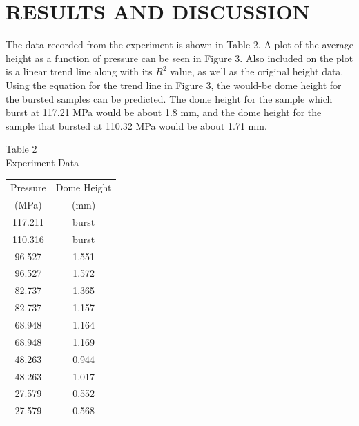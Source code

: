 \documentclass[12pt]{article}
\begin{document}
\section*{\fontsize{12}{12}\selectfont RESULTS AND DISCUSSION}
The data recorded from the experiment is shown in Table 2. A plot of the average height as a function of pressure can be seen in Figure 3. Also included on the plot is a linear trend line along with its $R^2$ value, as well as the original height data. Using the equation for the trend line in Figure 3, the would-be dome height for the bursted samples can be predicted. The dome height for the sample which burst at 117.21 MPa would be about 1.8 mm, and the dome height for the sample that bursted at 110.32 MPa would be about 1.71 mm.
\bigskip



\newpage


\begin{center}
Table 2\\
Experiment Data\\
\begin{tabular}{ c c }
\hline
Pressure  & Dome Height \\
(MPa)     & (mm)        \\
\hline
117.211 & burst       \\
110.316 & burst       \\
96.527  & 1.551    \\
96.527  & 1.572    \\
82.737  & 1.365    \\
82.737  & 1.157    \\
68.948   & 1.164     \\
68.948   & 1.169     \\
48.263  & 0.944    \\
48.263  & 1.017    \\
27.579  & 0.552    \\
27.579 & 0.568     \\
\hline
\end{tabular}
\end{center}
\bigskip
\bigskip
\end{document}
